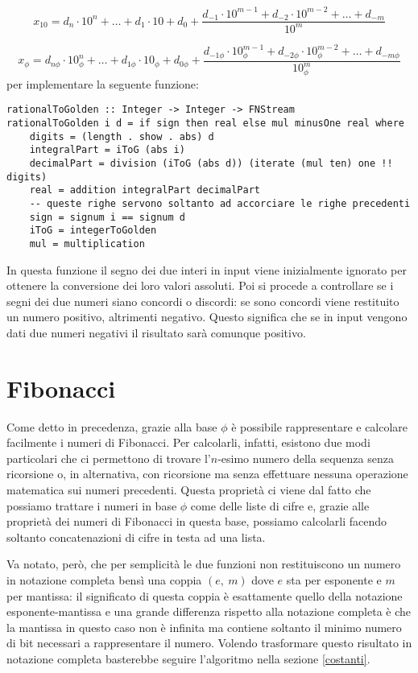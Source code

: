 \documentclass[Lau]{sapthesis}
\begin{document}
$$x_{10} = d_n \cdot 10^n + \ldots + d_1 \cdot 10 + d_0 + \frac{d_{-1} \cdot 10^{m-1} + d_{-2} \cdot 10^{m-2} + \ldots + d_{-m}}{10^m}$$

$$x_\phi = d_{n\phi} \cdot 10_\phi^n + \ldots + d_{1\phi} \cdot 10_\phi + d_{0\phi} + \frac{d_{-1\phi} \cdot 10_\phi^{m-1} + d_{-2\phi} \cdot 10_\phi^{m-2} + \ldots + d_{-m\phi}}{10_\phi^m}$$
per implementare la seguente funzione:
\begin{verbatim}
rationalToGolden :: Integer -> Integer -> FNStream
rationalToGolden i d = if sign then real else mul minusOne real where
    digits = (length . show . abs) d
    integralPart = iToG (abs i)
    decimalPart = division (iToG (abs d)) (iterate (mul ten) one !! digits)
    real = addition integralPart decimalPart
    -- queste righe servono soltanto ad accorciare le righe precedenti
    sign = signum i == signum d
    iToG = integerToGolden
    mul = multiplication
\end{verbatim}
In questa funzione il segno dei due interi in input viene inizialmente ignorato per ottenere la conversione dei loro valori assoluti. Poi si procede a controllare se i segni dei due numeri siano concordi o discordi: se sono concordi viene restituito un numero positivo, altrimenti negativo. Questo significa che se in input vengono dati due numeri negativi il risultato sarà comunque positivo.


\section{Fibonacci}
Come detto in precedenza, grazie alla base $\phi$ è possibile rappresentare e calcolare facilmente i numeri di Fibonacci. Per calcolarli, infatti, esistono due modi particolari che ci permettono di trovare l'$n$-esimo numero della sequenza senza ricorsione o, in alternativa, con ricorsione ma senza effettuare nessuna operazione matematica sui numeri precedenti. Questa proprietà ci viene dal fatto che possiamo trattare i numeri in base $\phi$ come delle liste di cifre e, grazie alle proprietà dei numeri di Fibonacci in questa base, possiamo calcolarli facendo soltanto concatenazioni di cifre in testa ad una lista.

Va notato, però, che per semplicità le due funzioni non restituiscono un numero in notazione completa bensì una coppia $(e, \ m)$ dove $e$ sta per esponente e $m$ per mantissa: il significato di questa coppia è esattamente quello della notazione esponente-mantissa e una grande differenza rispetto alla notazione completa è che la mantissa in questo caso non è infinita ma contiene soltanto il minimo numero di bit necessari a rappresentare il numero. Volendo trasformare questo risultato in notazione completa basterebbe seguire l'algoritmo nella sezione \ref{costanti}.
\end{document}
